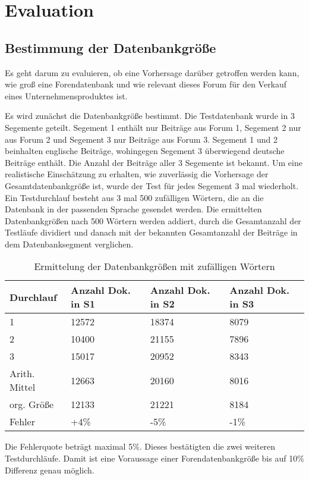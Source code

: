 \section{Evaluation}
\subsection{Bestimmung der Datenbankgröße}

Es geht darum zu evaluieren, ob eine Vorhersage darüber getroffen werden kann, wie groß eine Forendatenbank und wie relevant dieses Forum für den Verkauf eines Unternehmensproduktes ist.

Es wird zunächst die Datenbankgröße bestimmt. Die Testdatenbank wurde in 3 Segemente geteilt. Segement 1 enthält nur Beiträge aus Forum 1, Segement 2 nur aus Forum 2 und Segement 3 nur Beiträge aus Forum 3. 
Segement 1 und 2 beinhalten englische Beiträge, wohingegen Segement 3 überwiegend deutsche Beiträge enthält. Die Anzahl der Beiträge aller 3 Segemente ist bekannt. Um eine realistische Einschätzung zu erhalten, wie zuverlässig die Vorhersage der Gesamtdatenbankgröße ist, wurde der Test für jedes Segement 3 mal wiederholt. Ein Testdurchlauf besteht aus 3 mal 500 zufälligen Wörtern, die an die Datenbank in der passenden Sprache gesendet werden. Die ermittelten Datenbankgrößen nach 500 Wörtern werden addiert, durch die Gesamtanzahl der Testläufe dividiert und danach mit der bekannten Gesamtanzahl der Beiträge in dem Datenbanksegment verglichen.

\begin{table}[h!]
\begin{tabular}{ | p{3cm} | p{3cm} | p{3cm}| p{3cm} |} \hline
\textbf{Durchlauf} & \textbf{Anzahl Dok. in S1} & \textbf{Anzahl Dok. in S2} & \textbf{Anzahl Dok. in S3} \\ \hline
1 & 12572 & 18374 & 8079 \\ \hline
2 & 10400 & 21155 & 7896 \\ \hline
3 & 15017 & 20952 & 8343 \\ \hline
Arith. Mittel & 12663 & 20160 & 8016 \\ \hline
org. Größe & 12133 & 21221 & 8184 \\ \hline
Fehler & +4\% & -5\% & -1\% \\ \hline
\end{tabular}
\caption{Ermittelung der Datenbankgrößen mit zufälligen Wörtern}
\end{table}

Die Fehlerquote beträgt maximal 5\%. Dieses bestätigten die zwei weiteren Testdurchläufe. Damit ist eine Voraussage einer Forendatenbankgröße bis auf 10\% Differenz genau möglich.
